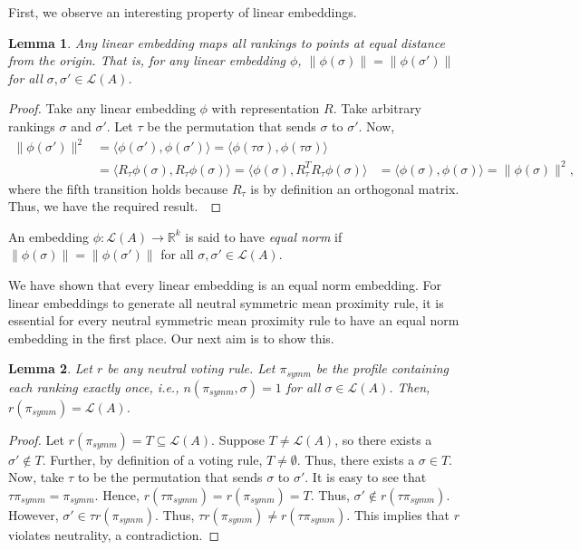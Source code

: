 \documentclass[10pt,letterpaper]{article}
\newcommand{\calL}{{\mathcal{L}}}
\newcommand{\rank}{{\calL(A)}}
\newtheorem{lemma}{Lemma}
\newenvironment{definition}[1][Definition]{\begin{trivlist}
\item[\hskip \labelsep {\bfseries #1}]}{\end{trivlist}}
\begin{document}
First, we observe an interesting property of linear embeddings.
\begin{lemma}
Any linear embedding maps all rankings to points at equal distance from the origin. That is, for any linear embedding $\phi$, $\|\phi(\sigma)\| = \|\phi(\sigma')\|$ for all $\sigma,\sigma' \in \rank$.
\label{lem:linear-equal-norm}
\end{lemma}
\begin{proof}
Take any linear embedding $\phi$ with representation $R$. Take arbitrary rankings $\sigma$ and $\sigma'$. Let $\tau$ be the permutation that sends $\sigma$ to $\sigma'$. Now, 
\begin{align*}
\|\phi(\sigma')\|^2 &= \langle \phi(\sigma'), \phi(\sigma') \rangle = \langle \phi(\tau \sigma), \phi(\tau \sigma) \rangle \\
&= \langle R_{\tau} \phi(\sigma), R_{\tau} \phi(\sigma) \rangle = \langle \phi(\sigma), R_{\tau}^T R_{\tau} \phi(\sigma) \rangle 
&= \langle \phi(\sigma), \phi(\sigma) \rangle = \|\phi(\sigma)\|^2,
\end{align*}
where the fifth transition holds because $R_{\tau}$ is by definition an orthogonal matrix. Thus, we have the required result.\
\end{proof}

\begin{definition}[Equal Norm Embedding]
An embedding $\phi : \rank \rightarrow \mathbb{R}^k$ is said to have \emph{equal norm} if $\|\phi(\sigma)\| = \|\phi(\sigma')\|$ for all $\sigma,\sigma' \in \rank$.
\end{definition}
We have shown that every linear embedding is an equal norm embedding. For linear embeddings to generate all neutral symmetric mean proximity rule, it is essential for every neutral symmetric mean proximity rule to have an equal norm embedding in the first place. Our next aim is to show this. 


\begin{lemma}
Let $r$ be any neutral voting rule. Let $\pi_{symm}$ be the profile containing each ranking exactly once, i.e., $n(\pi_{symm},\sigma) = 1$ for all $\sigma \in \rank$. Then, $r(\pi_{symm}) = \rank$. 
\label{lem:average-profile}
\end{lemma}
\begin{proof}
Let $r(\pi_{symm}) = T \subseteq \rank$. Suppose $T \neq \rank$, so there exists a $\sigma' \notin T$. Further, by definition of a voting rule, $T \neq \emptyset$. Thus, there exists a $\sigma \in T$. Now, take $\tau$ to be the permutation that sends $\sigma$ to $\sigma'$. %
It is easy to see that $\tau \pi_{symm} = \pi_{symm}$. Hence, $r(\tau \pi_{symm}) = r(\pi_{symm}) = T$. Thus, $\sigma' \notin r(\tau \pi_{symm})$. However, $\sigma' \in \tau r(\pi_{symm})$. Thus, $\tau r(\pi_{symm}) \neq r(\tau \pi_{symm})$. This implies that $r$ violates neutrality, a contradiction. 
\end{proof}
\end{document}
